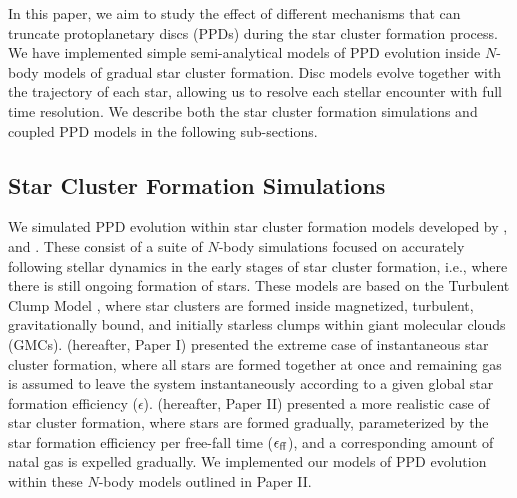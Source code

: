 \documentclass[fleqn,usenatbib]{mnras}
\newcommand\sfeff{\ensuremath{\epsilon_{\rm ff}}\xspace}   %
\begin{document}
In this paper, we aim to study the effect of different mechanisms that can truncate protoplanetary discs (PPDs) during the star cluster formation process. We have implemented simple semi-analytical models of PPD evolution inside $N$-body models of gradual star cluster formation. Disc models evolve together with the trajectory of each star, allowing us to resolve each stellar encounter with full time resolution. We describe both the star cluster formation simulations and coupled PPD models in the following sub-sections.

\subsection{Star Cluster Formation Simulations} 
\label{subsec:starclusterformation}

We simulated PPD evolution within star cluster formation models developed by \citet{Farias2017ApJ...838..116F}, \citet{Farias2019MNRAS.483.4999F} and \citet{Farias2023arXiv230108997F}. These consist of a suite of $N$-body simulations focused on accurately following stellar dynamics in the early stages of star cluster formation, i.e., where there is still ongoing formation of stars. These models are based on the Turbulent Clump Model \citep[TCM;][]{McKee2003ApJ...585..850M}, where star clusters are formed inside magnetized, turbulent, gravitationally bound, and initially starless clumps within giant molecular clouds (GMCs). \cite{Farias2017ApJ...838..116F} (hereafter, Paper I) presented the extreme case of instantaneous star cluster formation, where all stars are formed together at once and remaining gas is assumed to leave the system instantaneously according to a given global star formation efficiency ($\epsilon$). \cite{Farias2019MNRAS.483.4999F} (hereafter, Paper II) presented a more realistic case of star cluster formation, where stars are formed gradually, parameterized by the star formation efficiency per free-fall time (\sfeff), and a corresponding amount of natal gas is expelled gradually. We implemented our models of PPD evolution within these $N$-body models outlined in Paper II. 
\end{document}
